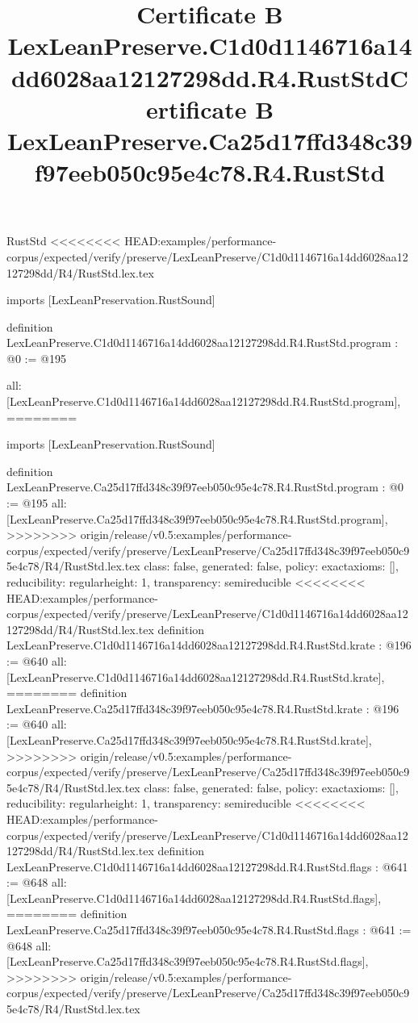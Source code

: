 \begin{lexlean}{RustStd}
<<<<<<<< HEAD:examples/performance-corpus/expected/verify/preserve/LexLeanPreserve/C1d0d1146716a14dd6028aa12127298dd/R4/RustStd.lex.tex
\title{Certificate B LexLeanPreserve.C1d0d1146716a14dd6028aa12127298dd.R4.RustStd}
\begin{coremodule}
imports [LexLeanPreservation.RustSound]

definition LexLeanPreserve.C1d0d1146716a14dd6028aa12127298dd.R4.RustStd.program : @0 := @195 {
  all: [LexLeanPreserve.C1d0d1146716a14dd6028aa12127298dd.R4.RustStd.program],
========
\title{Certificate B LexLeanPreserve.Ca25d17ffd348c39f97eeb050c95e4c78.R4.RustStd}
\begin{coremodule}
imports [LexLeanPreservation.RustSound]

definition LexLeanPreserve.Ca25d17ffd348c39f97eeb050c95e4c78.R4.RustStd.program : @0 := @195 {
  all: [LexLeanPreserve.Ca25d17ffd348c39f97eeb050c95e4c78.R4.RustStd.program],
>>>>>>>> origin/release/v0.5:examples/performance-corpus/expected/verify/preserve/LexLeanPreserve/Ca25d17ffd348c39f97eeb050c95e4c78/R4/RustStd.lex.tex
  class: false,
  generated: false,
  policy: exact{axioms: []},
  reducibility: regular{height: 1},
  transparency: semireducible
}
<<<<<<<< HEAD:examples/performance-corpus/expected/verify/preserve/LexLeanPreserve/C1d0d1146716a14dd6028aa12127298dd/R4/RustStd.lex.tex
definition LexLeanPreserve.C1d0d1146716a14dd6028aa12127298dd.R4.RustStd.krate : @196 := @640 {
  all: [LexLeanPreserve.C1d0d1146716a14dd6028aa12127298dd.R4.RustStd.krate],
========
definition LexLeanPreserve.Ca25d17ffd348c39f97eeb050c95e4c78.R4.RustStd.krate : @196 := @640 {
  all: [LexLeanPreserve.Ca25d17ffd348c39f97eeb050c95e4c78.R4.RustStd.krate],
>>>>>>>> origin/release/v0.5:examples/performance-corpus/expected/verify/preserve/LexLeanPreserve/Ca25d17ffd348c39f97eeb050c95e4c78/R4/RustStd.lex.tex
  class: false,
  generated: false,
  policy: exact{axioms: []},
  reducibility: regular{height: 1},
  transparency: semireducible
}
<<<<<<<< HEAD:examples/performance-corpus/expected/verify/preserve/LexLeanPreserve/C1d0d1146716a14dd6028aa12127298dd/R4/RustStd.lex.tex
definition LexLeanPreserve.C1d0d1146716a14dd6028aa12127298dd.R4.RustStd.flags : @641 := @648 {
  all: [LexLeanPreserve.C1d0d1146716a14dd6028aa12127298dd.R4.RustStd.flags],
========
definition LexLeanPreserve.Ca25d17ffd348c39f97eeb050c95e4c78.R4.RustStd.flags : @641 := @648 {
  all: [LexLeanPreserve.Ca25d17ffd348c39f97eeb050c95e4c78.R4.RustStd.flags],
>>>>>>>> origin/release/v0.5:examples/performance-corpus/expected/verify/preserve/LexLeanPreserve/Ca25d17ffd348c39f97eeb050c95e4c78/R4/RustStd.lex.tex
}}}
\end{coremodule}}
\end{coremodule}
\end{lexlean}
